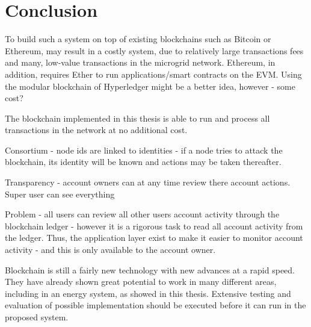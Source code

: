 \chapter{Conclusion}
To build such a system on top of existing blockchains such as Bitcoin or Ethereum, may result in a costly system, due to relatively large transactions fees and many, low-value transactions in the microgrid network. Ethereum, in addition, requires Ether to run applications/smart contracts on the EVM. Using the modular blockchain of Hyperledger might be a better idea, however - some cost?

The blockchain implemented in this thesis is able to run and process all transactions in the network at no additional cost.

Consortium - node ids are linked to identities - if a node tries to attack the blockchain, its identity will be known and actions may be taken thereafter. 

Transparency - account owners can at any time review there account actions. Super user can see everything

Problem - all users can review all other users account activity through the blockchain ledger - however it is a rigorous task to read all account activity from the ledger. Thus, the application layer exist to make it easier to monitor account activity - and this is only available to the account owner. 

Blockchain is still a fairly new technology with new advances at a rapid speed. They have already shown great potential to work in many different areas, including in an energy system, as showed in this thesis. Extensive testing and evaluation of possible implementation should be executed before it can run in the proposed system.
